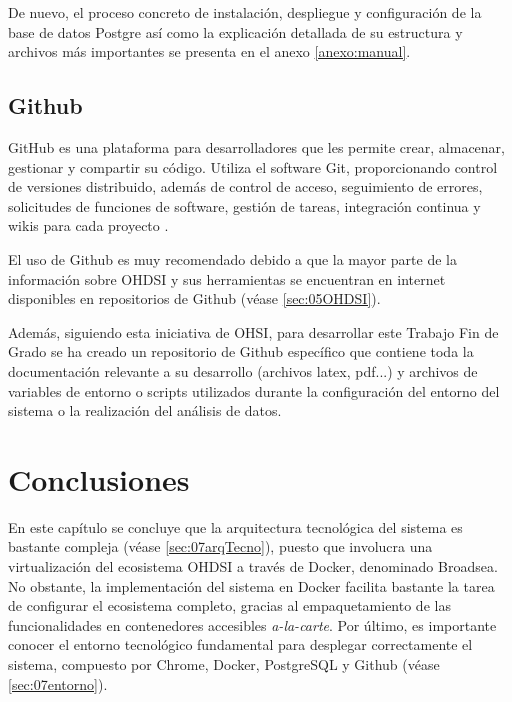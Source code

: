 De nuevo, el proceso concreto de instalación, despliegue y configuración de la base de datos Postgre así como la explicación detallada de su estructura y archivos más importantes se presenta en el anexo \ref{anexo:manual}.

\subsection{Github}

GitHub es una plataforma para desarrolladores que les permite crear, almacenar, gestionar y compartir su código. Utiliza el software Git, proporcionando control de versiones distribuido, además de control de acceso, seguimiento de errores, solicitudes de funciones de software, gestión de tareas, integración continua y wikis para cada proyecto \cite{GithubWikipedia}.

El uso de Github es muy recomendado debido a que la mayor parte de la información sobre OHDSI y sus herramientas se encuentran en internet disponibles en repositorios de Github (véase \ref{sec:05OHDSI}). 

Además, siguiendo esta iniciativa de OHSI, para desarrollar este Trabajo Fin de Grado se ha creado un repositorio de Github específico \cite{vallealonsodc} que contiene toda la documentación relevante a su desarrollo (archivos latex, pdf...) y archivos de variables de entorno o scripts utilizados durante la configuración del entorno del sistema o la realización del análisis de datos.   

\section{Conclusiones}

En este capítulo se concluye que la arquitectura tecnológica del sistema es bastante compleja (véase \ref{sec:07arqTecno}), puesto que involucra una virtualización del ecosistema OHDSI a través de Docker, denominado Broadsea. No obstante, la implementación del sistema en Docker facilita bastante la tarea de configurar el ecosistema completo, gracias al empaquetamiento de las funcionalidades en contenedores accesibles \textit{a-la-carte}. Por último, es importante conocer el entorno tecnológico fundamental para desplegar correctamente el sistema, compuesto por Chrome, Docker, PostgreSQL y Github (véase \ref{sec:07entorno}).
